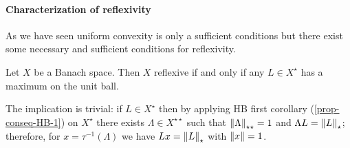 \paragraph{Characterization of reflexivity} As we have seen uniform convexity is only a sufficient conditions but there exist some necessary and sufficient conditions for reflexivity.

\begin{theo}[James]
	Let $X$ be a Banach space.
	Then $X$ reflexive if and only if any $L \in X^\star$ has a maximum on the unit ball.
\end{theo}

The implication is trivial: if $L\in X^\star$ then by applying HB first corollary (\vref{prop-conseq-HB-1}) on $X^{\star}$ there exists $\Lambda \in X^{\star\star}$ such that $\left\lVert\Lambda\right\rVert_{\star\star} =1$ and $\Lambda L=\left\lVert L\right\rVert_\star$; therefore, for $x = \tau^{-1}(\Lambda)$ we have $Lx=\left\lVert L\right\rVert_\star$ with $\left\lVert x\right\rVert = 1$.






















